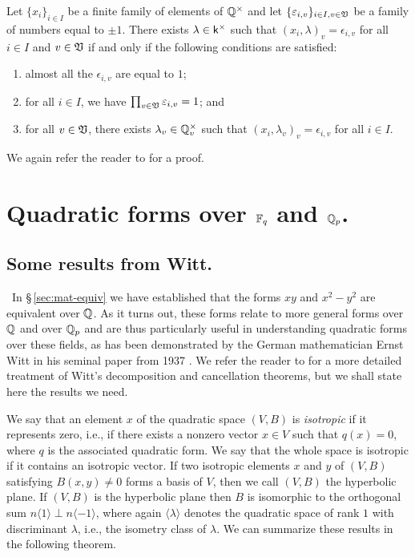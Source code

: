 \begin{theoremx}\label{thm:global-properties-hs}
    Let \(\{x_i\}_{i \in I}\) be a finite family of elements of \(\mathbb{Q}^{\times}\) and let \(\{\varepsilon_{i, v}\}_{i \in I, v \in \mathfrak{V}}\) be a family of numbers equal to \(\pm 1\). There exists \(\lambda \in \mathsf{k}^{\times}\) such that \((x_i, \lambda)_v = \epsilon_{i, v}\) for all \(i \in I\) and \(v \in \mathfrak{V}\) if and only if the following conditions are satisfied:

    \smallskip

    \begin{enumerate}[nosep, label=(\alph*)]
        \item almost all the \(\epsilon_{i, v}\) are equal to \(1\);
        \item for all \(i \in I\), we have \(\prod_{v \in \mathfrak{V}} \varepsilon_{i, v} = 1\); and
        \item for all \(v \in \mathfrak{V}\), there exists \(\lambda_v \in \mathbb{Q}_v^{\times}\) such that \((x_i, \lambda_v)_v = \epsilon_{i, v}\) for all \(i \in I\).
    \end{enumerate}
\end{theoremx}

We again refer the reader to \cite[pp.~24--26]{serre2012course} for a proof.

\section{Quadratic forms over \(\mathbb{F}_q\) and \(\mathbb{Q}_p\).}

\subsection{Some results from Witt.}~In \S\,\ref{sec:mat-equiv} we have established that the forms \(xy\) and \(x^2 - y^2\) are equivalent over \(\mathbb{Q}\). As it turns out, these forms relate to more general forms over \(\mathbb{Q}\) and over \(\mathbb{Q}_p\) and are thus particularly useful in understanding quadratic forms over these fields, as has been demonstrated by the German mathematician Ernst Witt in his seminal paper from 1937 \cite{witt1937theorie}. We refer the reader to \cite{lam1973quadratic} for a more detailed treatment of Witt's decomposition and cancellation theorems, but we shall state here the results we need.\label{sec:results-from-witt}

We say that an element \(x\) of the quadratic space \((V,B)\) is \emph{isotropic} if it represents zero, i.e., if there exists a nonzero vector \(x \in V\) such that \(q(x) = 0\), where \(q\) is the associated quadratic form. We say that the whole space is isotropic if it contains an isotropic vector. If two isotropic elements \(x\) and \(y\) of \((V,B)\) satisfying \(B(x,y) \neq 0\) forms a basis of \(V\), then we call \((V, B)\) the hyperbolic plane. If \((V,B)\) is the hyperbolic plane then \(B\) is isomorphic to the orthogonal sum \(n\langle 1 \rangle \perp n \langle -1 \rangle\), where again \(\langle \lambda \rangle\) denotes the quadratic space of rank \(1\) with discriminant \(\lambda\), i.e., the isometry class of \(\lambda\). We can summarize these results in the following theorem.

